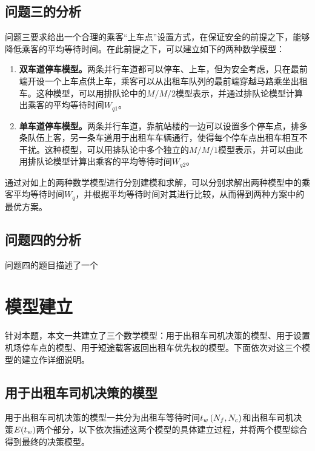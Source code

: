 \documentclass{cumcm}
\begin{document}
\subsection{问题三的分析}
问题三要求给出一个合理的乘客“上车点”设置方式，在保证安全的前提之下，能够降低乘客的平均等待时间。在此前提之下，可以建立如下的两种数学模型：
\begin{enumerate}[(1)]
	\item \textbf{双车道停车模型。}两条并行车道都可以停车、上车，但为安全考虑，只在最前端开设一个上车点供上车，乘客可以从出租车队列的最前端穿越马路乘坐出租车。这种模型，可以用排队论中的$M/M/2$模型表示，并通过排队论模型计算出乘客的平均等待时间$W_{q1}$。
	\item \textbf{单车道停车模型。}两条并行车道，靠航站楼的一边可以设置多个停车点，排多条队伍上客，另一条车道用于出租车车辆通行，使得每个停车点出租车相互不干扰。这种模型，可以用排队论中多个独立的$M/M/1$模型表示，并可以由此用排队论模型计算出乘客的平均等待时间$W_{q2}$。
\end{enumerate}
\par
通过对如上的两种数学模型进行分别建模和求解，可以分别求解出两种模型中的乘客平均等待时间$W_q$，并根据平均等待时间对其进行比较，从而得到两种方案中的最优方案。
\subsection{问题四的分析}
问题四的题目描述了一个
\section{模型建立}
针对本题，本文一共建立了三个数学模型：用于出租车司机决策的模型、用于设置机场停车点的模型、用于短途载客返回出租车优先权的模型。下面依次对这三个模型的建立作详细说明。
\subsection{用于出租车司机决策的模型}
用于出租车司机决策的模型一共分为出租车等待时间$\mbox{$t_w$}\left(\mbox{$N_f$},\mbox{$N_c$}\right)$和出租车司机决策$E(\mbox{$t_w$})$两个部分，以下依次描述这两个模型的具体建立过程，并将两个模型综合得到最终的决策模型。
\end{document}

